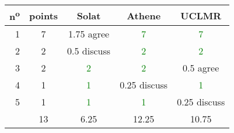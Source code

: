 \begin{center}
 \begin{tabular}{ r | c || c c c }
  n\textsuperscript{o} & points & Solat                & Athene               & UCLMR                \\ \hline
  1                    & 7      & 1.75 agree           & \textcolor{green}{7} & \textcolor{green}{7} \\
  2                    & 2      & 0.5 discuss          & \textcolor{green}{2} & \textcolor{green}{2} \\
  3                    & 2      & \textcolor{green}{2} & \textcolor{green}{2} & 0.5 agree            \\
  4                    & 1      & \textcolor{green}{1} & 0.25 discuss         & \textcolor{green}{1} \\
  5                    & 1      & \textcolor{green}{1} & \textcolor{green}{1} & 0.25 discuss         \\ \hline
                       & 13     & 6.25                 & 12.25                & 10.75                \\
 \end{tabular}
\end{center}
